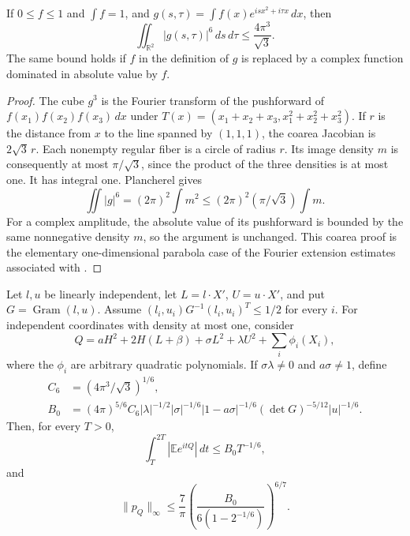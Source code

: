 \begin{lemma}\label{lem:hub-strichartz}
If $0\le f\le1$ and $\int f=1$, and
$g(s,\tau)=\int f(x)e^{isx^2+i\tau x}\,dx$, then
\[
 \iint_{\mathbb R^2}|g(s,\tau)|^6\,ds\,d\tau
 \le \frac{4\pi^3}{\sqrt3}.
\]
The same bound holds if $f$ in the definition of $g$ is replaced
by a complex function dominated in absolute value by $f$.
\end{lemma}

\begin{proof}
The cube $g^3$ is the Fourier transform of the pushforward of
$f(x_1)f(x_2)f(x_3)\,dx$ under
$T(x)=(x_1+x_2+x_3,x_1^2+x_2^2+x_3^2)$.
If $r$ is the distance from $x$ to the line spanned by
$(1,1,1)$, the coarea Jacobian is $2\sqrt3\,r$.
Each nonempty regular fiber is a circle of radius $r$.
Its image density $m$ is consequently at most
$\pi/\sqrt3$, since the product of the three densities is at
most one.  It has integral one.  Plancherel gives
\[
 \iint |g|^6=(2\pi)^2\int m^2
 \le(2\pi)^2(\pi/\sqrt3)\int m.
\]
For a complex amplitude, the absolute value of its pushforward
is bounded by the same nonnegative density $m$, so the argument
is unchanged.  This coarea proof is the elementary
one-dimensional parabola case of the Fourier extension estimates
associated with \citet{Strichartz1977,Foschi2007,HZ2006}.
\end{proof}

\begin{theorem}
\label{thm:hub-degenerate}
Let $l,u$ be linearly independent, let
$L=l\cdot X'$, $U=u\cdot X'$, and put
$G=\operatorname{Gram}(l,u)$.
Assume $(l_i,u_i)G^{-1}(l_i,u_i)^T\le1/2$ for every $i$.
For independent coordinates with density at most one, consider
\[
 Q=aH^2+2H(L+\beta)+\sigma L^2+\lambda U^2
                                      +\sum_i\phi_i(X_i),
\]
where the $\phi_i$ are arbitrary quadratic polynomials.
If $\sigma\lambda\ne0$ and $a\sigma\ne1$, define
\[
 \begin{split}
 C_6&=(4\pi^3/\sqrt3)^{1/6},\\
 B_0&=(4\pi)^{5/6}C_6
 |\lambda|^{-1/2}|\sigma|^{-1/6}|1-a\sigma|^{-1/6}
               (\det G)^{-5/12}|u|^{-1/6}.
 \end{split}
\]
Then, for every $T>0$,
\begin{equation}\label{eq:hub-strichartz-block}
 \int_T^{2T}|\mathbb E e^{itQ}|\,dt\le B_0T^{-1/6},
\end{equation}
and
\[
 \|p_Q\|_\infty
 \le\frac7\pi
 \left(\frac{B_0}{6(1-2^{-1/6})}\right)^{6/7}.
\]
\end{theorem}

